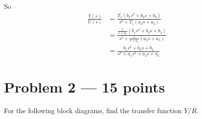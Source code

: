 \documentclass[12pt]{article}
\begin{document}
        So 
        \begin{align*}
            \frac{Y(s)}{U(s)} &= \frac{T_1(b_1 s^2 + b_2 s + b_3)}{s^2 + T_1(a_2s + a_3)}\\ 
            &= \frac{\frac{1}{s + a_1}(b_1 s^2 + b_2 s + b_3)}{s^2 + \frac{1}{s + a_1}(a_2s + a_3)}\\ 
            &= \boxed{\frac{b_1 s^2 + b_2 s + b_3}{s^3 + a_1s^2 + a_2 s + a_3}}
        \end{align*}
    
    \color{black}


\section*{Problem 2 --- 15 points}
    For the following block diagrams, find the transfer function $Y/R$.
\end{document}

